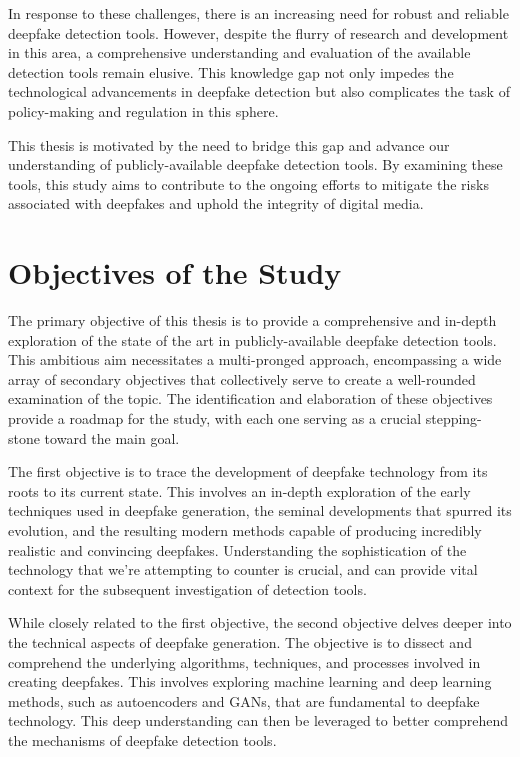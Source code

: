 In response to these challenges, there is an increasing need for robust and reliable
deepfake detection tools. However, despite the flurry of research and development in this
area, a comprehensive understanding and evaluation of the available detection tools remain
elusive. This knowledge gap not only impedes the technological advancements in deepfake
detection but also complicates the task of policy-making and regulation in this sphere.

This thesis is motivated by the need to bridge this gap and advance our understanding of
publicly-available deepfake detection tools. By examining these tools, this study aims to
contribute to the ongoing efforts to mitigate the risks associated with deepfakes and uphold
the integrity of digital media.


\section{Objectives of the Study}\label{chapter:objectives}
The primary objective of this thesis is to provide a comprehensive and in-depth exploration 
of the state of the art in publicly-available deepfake detection tools. This ambitious aim 
necessitates a multi-pronged approach, encompassing a wide array of secondary objectives 
that collectively serve to create a well-rounded examination of the topic. The identification 
and elaboration of these objectives provide a roadmap for the study, with each one serving 
as a crucial stepping-stone toward the main goal.

The first objective is to trace the development of deepfake technology from its roots to its 
current state. This involves an in-depth exploration of the early techniques used in deepfake 
generation, the seminal developments that spurred its evolution, and the resulting modern 
methods capable of producing incredibly realistic and convincing deepfakes. Understanding the 
sophistication of the technology that we're attempting to counter is crucial, and can provide 
vital context for the subsequent investigation of detection tools.

While closely related to the first objective, the second objective delves deeper into the 
technical aspects of deepfake generation. The objective is to dissect and comprehend the 
underlying algorithms, techniques, and processes involved in creating deepfakes. This involves 
exploring machine learning and deep learning methods, such as autoencoders and 
\ac{GAN}s, that are fundamental to deepfake technology. This deep understanding can 
then be leveraged to better comprehend the mechanisms of deepfake detection tools.

